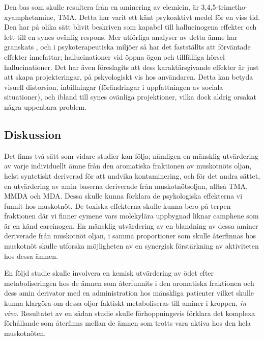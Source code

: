 \documentclass[a4paper,margin=3.25cm]{article}
\begin{document}
{	Den bas som skulle resultera från en aminering av elemicin, är
	3,4,5-trimetho-xyamphetamine, TMA. Detta har varit ett känt psykoaktivt medel för en viss tid. \cite{peretz1955new}
	Den har på olika sätt blivit beskriven som kapabel till hallucinogena effekter
	och lett till en synes ovänlig respons. \cite{shulgin1995pihkal}
	Mer utförliga analyser av detta ämne har granskats \cite{shulgin1995pihkal}, och i psykoterapeutiska miljöer så har det fastställts att förväntade effekter innefattar; hallucinationer vid öppna ögon och tillfälliga hörsel hallucinationer.
	Det har även föreslagits att dess karaktärsgivande effekter är just att skapa projekteringar, på pskyologiskt vis hos användaren.
	Detta kan betyda visuell distorsion, inbillningar (förändringar i uppfattningen av sociala situationer), och ibland till synes ovänliga projektioner, vilka dock aldrig orsakat några uppenbara problem.

	\subsection{Diskussion}

Det finns två sätt som vidare studier kan följa; nämligen en mänsklig utvärdering
av varje individuellt ämne från den aromatiska fraktionen av muskotnöts oljan,
helst syntetiskt deriverad för att undvika kontaminering, och för det andra sättet,
en utvärdering av amin baserna deriverade från muskotnötsoljan, alltså
TMA, MMDA och MDA. Dessa skulle kunna förklara de psykologiska effekterna
vi funnit hos muskotnöt. De toxiska effekterna skulle kunna bero på terpen fraktionen
där vi finner cymene vars molekylära uppbygnad liknar camphene som är en känd
carcinogen. En mänsklig utvärdering av en blandning av dessa aminer deriverade från
muskotnöt oljan, i samma proportioner som skulle återfinnas hos muskotnöt skulle
utforska möjligheten av en synergisk förstärkning av aktiviteten hos dessa ämnen.

En följd studie skulle involvera en kemisk utvärdering av ödet efter metaboliseringen
hos de ämnen som återfunnits i den aromatiska fraktionen och dess amin derivator
med en administration hos mänskliga patienter vilket skulle kunna klargöra om dessa
oljor faktiskt metaboliseras till aminer i kroppen, \textit{in vivo}.
Resultatet av en sådan studie skulle förhoppningsvis förklara det
komplexa förhållande som återfinns mellan de ämnen som trotts vara aktiva
hos den hela muskotnöten.




}
\end{document}
